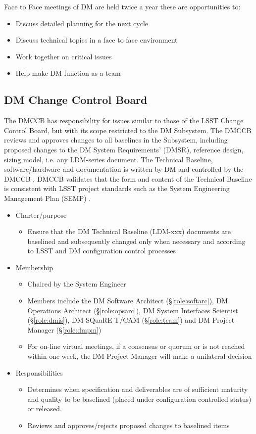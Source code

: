 Face to Face meetings of DM are held twice a year these are opportunities to:

\begin{itemize}
\item Discuss detailed planning for the next cycle
\item Discuss technical topics in a face to face environment
\item Work together on critical issues
\item Help make DM function as a team
\end{itemize}

\subsection{DM Change Control Board \label{sect:dmccb}}

The DMCCB has responsibility for issues similar to those of the LSST Change Control Board, but with its scope restricted to the DM Subsystem.
The DMCCB reviews and approves changes to all baselines in the Subsystem, including proposed changes to the DM System Requirements' (DMSR), reference design, sizing model, i.e. any LDM-series document.
The Technical Baseline, software/hardware and documentation is written by DM and controlled by the DMCCB
, DMCCB validates that the form and content of the Technical Baseline is consistent with LSST project standards such as the System Engineering Management Plan (SEMP) .

\begin{itemize}
\item Charter/purpose
	\begin{itemize}
	\item Ensure that the DM Technical Baseline (LDM-xxx) documents are baselined and subsequently changed only when necessary and according to LSST and DM configuration control processes
	\end{itemize}
\item Membership
	\begin{itemize}
	\item Chaired by the System Engineer
	\item Members include the DM Software Architect (\S\ref{role:softarc}), DM Operations Architect (\S\ref{role:opsarc}), DM System Interfaces Scientist (\S\ref{role:dmis}), DM SQuaRE T/CAM (\S\ref{role:tcam}) and DM Project Manager (\S\ref{role:dmpm})
	\item For on-line virtual meetings, if a consensus or quorum or is not reached within one week, the DM Project Manager will make a unilateral decision
	\end{itemize}
\item Responsibilities
	\begin{itemize}
	\item Determines when specification and deliverables are of sufficient maturity and quality to be baselined (placed under configuration controlled status) or released.
	\item Reviews and approves/rejects proposed changes to baselined items
	\end{itemize}
\end{itemize}
